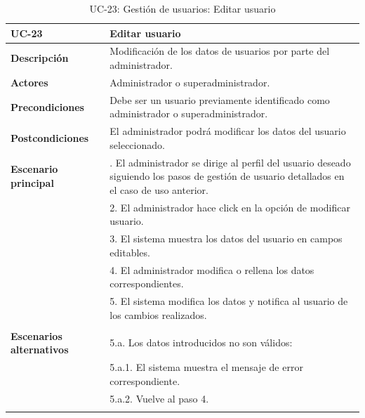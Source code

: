 \begin{table}
  \begin{center}
    \begin{tabularx}{16.4cm}{|l|X|}
      \hline
      \textbf{UC-23} & \textbf{Editar usuario}\\
      \hline
      \textbf{Descripción} & Modificación de los datos de usuarios por parte del administrador.\\
      \hline
      \textbf{Actores} & Administrador o superadministrador.\\
      \hline
      \textbf{Precondiciones} & Debe ser un usuario previamente identificado como administrador o superadministrador.\\
      \hline
      \textbf{Postcondiciones} & El administrador podrá modificar los datos del usuario seleccionado.\\
      \hline
      \textbf{Escenario principal} & \smallskip 1. El administrador se dirige al perfil del usuario deseado siguiendo los pasos de gestión de usuario detallados en el caso de uso anterior.\\
      & 2. El administrador hace click en la opción de modificar usuario. \\
      & 3. El sistema muestra los datos del usuario en campos editables.\\
      & 4. El administrador modifica o rellena los datos correspondientes.\\
      & 5. El sistema modifica los datos y notifica al usuario de los cambios realizados.\\ 
      & \\
      \hline
      \textbf{Escenarios alternativos} & \smallskip 5.a. Los datos introducidos no son válidos:\\
      & \hspace{0.3cm} 5.a.1. El sistema muestra el mensaje de error correspondiente.\\
      & \hspace{0.3cm} 5.a.2. Vuelve al paso 4.\\
      & \\
      \hline
    \end{tabularx}
    \caption{UC-23: Gestión de usuarios: Editar usuario}
    \label{tab:CU-editar-usuario-admin}
  \end{center}
\end{table}


